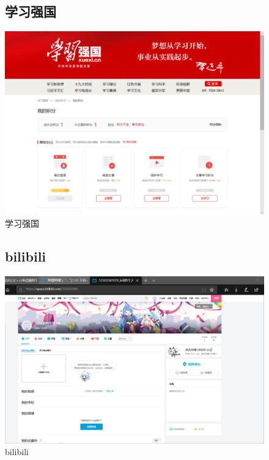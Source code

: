 \documentclass{article}
\begin{document}
\begin{itemize}
\begin{figure}[htb!]
\item\subsection{学习强国}
\centering
\includegraphics[scale=0.25]{xuexiqiangguo}
\caption{学习强国}
\label{fig:xuexiqiangguo}
\end{figure}

\begin{figure}[htb!]
\item\subsection{bilibili}
\centering
\includegraphics[scale=0.25]{bilibili}
\caption{bilibili}
\label{fig:bilibili}
\end{figure}


\end{itemize}
\end{document}
